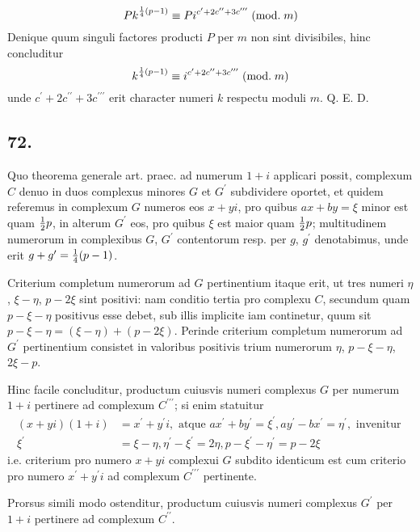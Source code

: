\documentclass[twoside,12pt]{memoir}
\renewcommand{\pmod}[1]{\;(\textrm{mod.}\;#1)}
\let\oldfrac\frac
\def\frac#1#2{\mathchoice{\tfrac{#1}{#2}}{\oldfrac{#1}{#2}}{\genfrac{}{}{}{2}{#1}{#2\mathstrut}}{\genfrac{}{}{}{3}{#1}{#2\mathstrut}}}
\begin{document}
\[P k^{\frac{1}{4}(p-1)} \equiv P i^{c^{\prime}+2 c^{\prime \prime}+3 c^{\prime \prime \prime}}\pmod{m}\]
Denique quum singuli factores producti \(P\) per \(m\) non sint divisibiles, hinc concluditur
\[k^{\frac{1}{4}(p-1)} \equiv i^{c^{\prime}+2 c^{\prime \prime}+3 c^{\prime \prime \prime}}\pmod{m}\]
unde \(c^{\prime}+2 c^{\prime \prime}+3 c^{\prime \prime \prime}\) erit character numeri \(k\) respectu moduli \(m\). Q. E. D.\pagebreak%

\subsection*{72.}
 
Quo theorema generale art. praec. ad numerum \(1+i\) applicari possit, complexum \(C\) denuo in duos complexus minores \(G\) et \(G^{\prime}\) subdividere oportet, et quidem referemus in complexum \(G\) numeros eos \(x+y i\), pro quibus \(a x+b y=\xi\) minor est quam \(\frac{1}{2} p\), in alterum \(G^{\prime}\) eos, pro quibus \(\xi\) est maior quam \(\frac{1}{2} p\); multitudinem numerorum in complexibus \(G\), \( G^{\prime}\) contentorum resp. per \(g\), \( g^{\prime}\) denotabimus, unde erit \(g+g^{\prime}=\frac{1}{4}(p-1)\).
 
Criterium completum numerorum ad \(G\) pertinentium itaque erit, ut tres numeri \(\eta\), \( \xi-\eta\), \( p-2 \xi\) sint positivi: nam conditio tertia pro complexu \(C\), secundum quam \(p-\xi-\eta\) positivus esse debet, sub illis implicite iam continetur, quum sit \(p-\xi-\eta=(\xi-\eta)+(p-2 \xi)\). Perinde criterium completum numerorum ad \(G^{\prime}\) pertinentium consistet in valoribus positivis trium numerorum \(\eta\), \(p-\xi-\eta\), \( 2 \xi-p\).
 
Hinc facile concluditur, productum cuiusvis numeri complexus \(G\) per numerum \(1+i\) pertinere ad complexum \(C^{\prime \prime \prime}\); si enim statuitur
\[\begin{aligned}
(x+y i)(1+i) & =x^{\prime}+y^{\prime} i, \text{ atque } a x^{\prime}+b y^{\prime}=\xi^{\prime}, a y^{\prime}-b x^{\prime}=\eta^{\prime}, \text{ invenitur } \\
\xi^{\prime} & =\xi-\eta, \eta^{\prime}-\xi^{\prime}=2 \eta, p-\xi^{\prime}-\eta^{\prime}=p-2 \xi
\end{aligned}\]
i.e. criterium pro numero \(x+y i\) complexui \(G\) subdito identicum est cum criterio pro numero \(x^{\prime}+y^{\prime} i\) ad complexum \(C^{\prime \prime \prime}\) pertinente.
 
Prorsus simili modo ostenditur, productum cuiusvis numeri complexus \(G^{\prime}\) per \(1+i\) pertinere ad complexum \(C^{\prime \prime}\).
 
\end{document}
